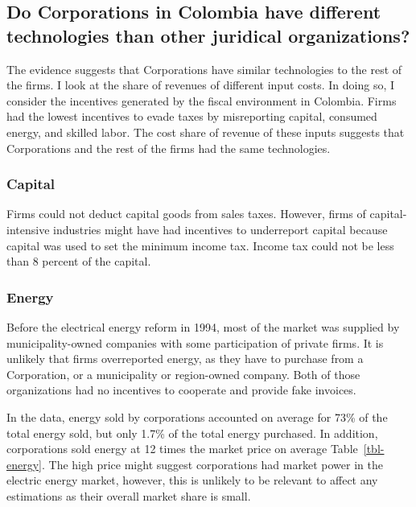 \documentclass[
  12pt]{article}
\begin{document}
\subsection{Do Corporations in Colombia have different technologies than
other juridical
organizations?}\label{do-corporations-in-colombia-have-different-technologies-than-other-juridical-organizations}

The evidence suggests that Corporations have similar technologies to the
rest of the firms. I look at the share of revenues of different input
costs. In doing so, I consider the incentives generated by the fiscal
environment in Colombia. Firms had the lowest incentives to evade taxes
by misreporting capital, consumed energy, and skilled labor. The cost
share of revenue of these inputs suggests that Corporations and the rest
of the firms had the same technologies.

\subsubsection{Capital}\label{capital}

Firms could not deduct capital goods from sales taxes. However, firms of
capital-intensive industries might have had incentives to underreport
capital because capital was used to set the minimum income tax. Income
tax could not be less than 8 percent of the capital.

\subsubsection{Energy}\label{energy}

Before the electrical energy reform in 1994, most of the market was
supplied by municipality-owned companies with some participation of
private firms. It is unlikely that firms overreported energy, as they
have to purchase from a Corporation, or a municipality or region-owned
company. Both of those organizations had no incentives to cooperate and
provide fake invoices.

In the data, energy sold by corporations accounted on average for 73\%
of the total energy sold, but only 1.7\% of the total energy purchased.
In addition, corporations sold energy at 12 times the market price on
average Table~\ref{tbl-energy}. The high price might suggest
corporations had market power in the electric energy market, however,
this is unlikely to be relevant to affect any estimations as their
overall market share is small.
\end{document}
